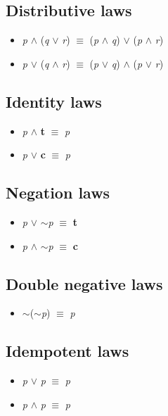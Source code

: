 \documentclass{article}
\begin{document}
\subsection{Distributive laws}
\begin{itemize}
\item \textit{p} $\wedge$ (\textit{q} $\lor$ \textit{r}) $\equiv$ (\textit{p} $\wedge$ \textit{q}) $\lor$ (\textit{p} $\wedge$ \textit{r})
\item \textit{p} $\lor$ (\textit{q} $\wedge$ \textit{r}) $\equiv$ (\textit{p} $\lor$ \textit{q}) $\wedge$ (\textit{p} $\lor$ \textit{r})
\end{itemize}

\subsection{Identity laws}
\begin{itemize}
\item \textit{p} $\wedge$ \textbf{t} $\equiv$ \textit{p}
\item \textit{p} $\lor$ \textbf{c} $\equiv$ \textit{p}
\end{itemize}

\subsection{Negation laws}
\begin{itemize}
\item \textit{p} $\lor$ $\sim$\textit{p} $\equiv$ \textbf{t}
\item \textit{p} $\wedge$ $\sim$\textit{p} $\equiv$ \textbf{c}
\end{itemize}

\subsection{Double negative laws}
\begin{itemize}
\item $\sim$($\sim$\textit{p}) $\equiv$ \textit{p}
\end{itemize}

\subsection{Idempotent laws}
\begin{itemize}
\item \textit{p} $\lor$ \textit{p} $\equiv$ \textit{p}
\item \textit{p} $\wedge$ \textit{p} $\equiv$ \textit{p}
\end{itemize}
\end{document}
